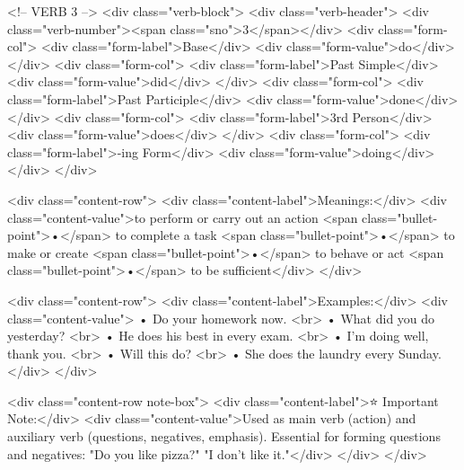         <!-- VERB 3 -->
        <div class="verb-block">
            <div class="verb-header">
                <div class="verb-number"><span class="sno">3</span></div>
                <div class="form-col">
                    <div class="form-label">Base</div>
                    <div class="form-value">do</div>
                </div>
                <div class="form-col">
                    <div class="form-label">Past Simple</div>
                    <div class="form-value">did</div>
                </div>
                <div class="form-col">
                    <div class="form-label">Past Participle</div>
                    <div class="form-value">done</div>
                </div>
                <div class="form-col">
                    <div class="form-label">3rd Person</div>
                    <div class="form-value">does</div>
                </div>
                <div class="form-col">
                    <div class="form-label">-ing Form</div>
                    <div class="form-value">doing</div>
                </div>
            </div>
            
            <div class="content-row">
                <div class="content-label">Meanings:</div>
                <div class="content-value">to perform or carry out an action <span class="bullet-point">•</span> to complete a task <span class="bullet-point">•</span> to make or create <span class="bullet-point">•</span> to behave or act <span class="bullet-point">•</span> to be sufficient</div>
            </div>
            
            <div class="content-row">
                <div class="content-label">Examples:</div>
                <div class="content-value">
                    • Do your homework now. <br>
                    • What did you do yesterday? <br>
                    • He does his best in every exam. <br>
                    • I'm doing well, thank you. <br>
                    • Will this do? <br>
                    • She does the laundry every Sunday.
                </div>
            </div>
            
            <div class="content-row note-box">
                <div class="content-label">⭐ Important Note:</div>
                <div class="content-value">Used as main verb (action) and auxiliary verb (questions, negatives, emphasis). Essential for forming questions and negatives: "Do you like pizza?" "I don't like it."</div>
            </div>
        </div>
        

